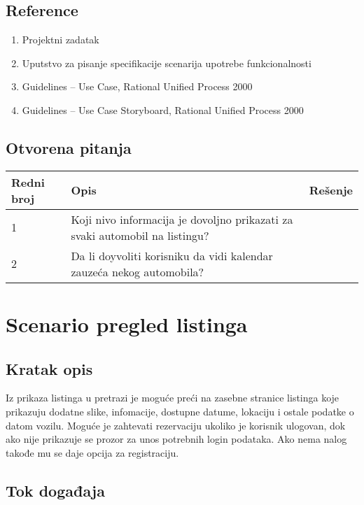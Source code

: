 \documentclass[12pt]{article}
\begin{document}
\subsection{Reference}
\begin{enumerate}
   \item Projektni zadatak
   \item Uputstvo za pisanje specifikacije scenarija upotrebe funkcionalnosti
   \item  Guidelines – Use Case, Rational Unified Process 2000
   \item  Guidelines – Use Case Storyboard, Rational Unified Process 2000
 \end{enumerate}
\subsection{Otvorena pitanja}


\begin{center}
\begin{tabular}{ | m{2cm} | m{7cm}| m{7cm} | } 
\hline
Redni broj& Opis & Rešenje \\ 
\hline
1 & Koji nivo informacija je dovoljno prikazati za svaki automobil na listingu? & \\ 
\hline
2 & Da li doyvoliti korisniku da vidi kalendar zauzeća nekog automobila? & \\
\hline
\end{tabular}
\end{center}

    

\section{Scenario pregled listinga}
\subsection{Kratak opis}
Iz prikaza listinga u pretrazi je moguće preći na zasebne stranice listinga koje prikazuju dodatne slike, infomacije, dostupne datume, 
lokaciju i ostale podatke o datom vozilu. Moguće je zahtevati rezervaciju ukoliko je korisnik ulogovan, dok ako nije prikazuje se prozor za unos potrebnih login podataka. 
Ako nema nalog takođe mu se daje opcija za registraciju.
\subsection{Tok događaja}
\end{document}
